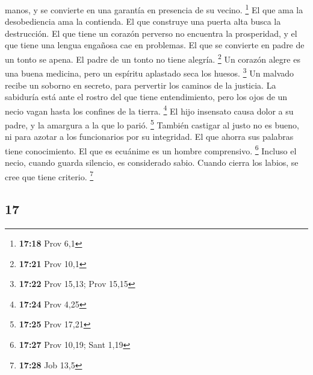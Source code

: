 \begin{paracol}{2}
manos, y se convierte en una garantía en presencia de su vecino.
\footnote{\textbf{17:18} Prov 6,1}  El que ama la
desobediencia ama la contienda. El que construye una puerta alta busca
la destrucción.  El que tiene un corazón perverso no
encuentra la prosperidad, y el que tiene una lengua engañosa cae en
problemas.  El que se convierte en padre de un tonto se
apena. El padre de un tonto no tiene alegría. \footnote{\textbf{17:21}
  Prov 10,1}  Un corazón alegre es una buena medicina,
pero un espíritu aplastado seca los huesos. \footnote{\textbf{17:22}
  Prov 15,13; Prov 15,15}  Un malvado recibe un soborno
en secreto, para pervertir los caminos de la justicia. 
La sabiduría está ante el rostro del que tiene entendimiento, pero los
ojos de un necio vagan hasta los confines de la tierra. \footnote{\textbf{17:24}
  Prov 4,25}  El hijo insensato causa dolor a su padre, y
la amargura a la que lo parió. \footnote{\textbf{17:25} Prov 17,21}
 También castigar al justo no es bueno, ni para azotar a
los funcionarios por su integridad.  El que ahorra sus
palabras tiene conocimiento. El que es ecuánime es un hombre
comprensivo. \footnote{\textbf{17:27} Prov 10,19; Sant 1,19}
 Incluso el necio, cuando guarda silencio, es considerado
sabio. Cuando cierra los labios, se cree que tiene criterio. \footnote{\textbf{17:28}
  Job 13,5}

\switchcolumn
\begin{otherlanguage}{english}

\hypertarget{section-33}{%
\section{17}\label{section-33}}


\end{otherlanguage}
\end{paracol}
